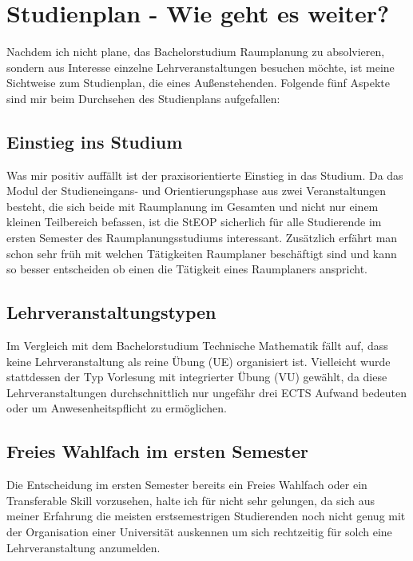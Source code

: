 \documentclass[]{article}
\begin{document}
\section{Studienplan - Wie geht es weiter?}
Nachdem ich nicht plane, das Bachelorstudium Raumplanung zu absolvieren, sondern aus Interesse einzelne Lehrveranstaltungen besuchen möchte, ist meine Sichtweise zum Studienplan, die eines Außenstehenden. Folgende fünf Aspekte sind mir beim Durchsehen des Studienplans aufgefallen:

\subsection{Einstieg ins Studium}
Was mir positiv auffällt ist der praxisorientierte Einstieg in das Studium. Da das Modul der Studieneingans- und Orientierungsphase aus zwei Veranstaltungen besteht, die sich beide mit Raumplanung im Gesamten und nicht nur einem kleinen Teilbereich befassen, ist die StEOP sicherlich für alle Studierende im ersten Semester des Raumplanungsstudiums interessant. Zusätzlich erfährt man schon sehr früh mit welchen Tätigkeiten Raumplaner beschäftigt sind und kann so besser entscheiden ob einen die Tätigkeit eines Raumplaners anspricht.

\subsection{Lehrveranstaltungstypen}
Im Vergleich mit dem Bachelorstudium Technische Mathematik fällt auf, dass keine Lehrveranstaltung als reine Übung (UE) organisiert ist. Vielleicht wurde stattdessen der Typ Vorlesung mit integrierter Übung (VU) gewählt, da diese Lehrveranstaltungen durchschnittlich nur ungefähr drei ECTS Aufwand bedeuten oder um Anwesenheitspflicht zu ermöglichen.

\subsection{Freies Wahlfach im ersten Semester}
Die Entscheidung im ersten Semester bereits ein Freies Wahlfach oder ein Transferable Skill vorzusehen, halte ich für nicht sehr gelungen, da sich aus meiner Erfahrung die meisten erstsemestrigen Studierenden noch nicht genug mit der Organisation einer Universität auskennen um sich rechtzeitig für solch eine Lehrveranstaltung anzumelden.
\end{document}
